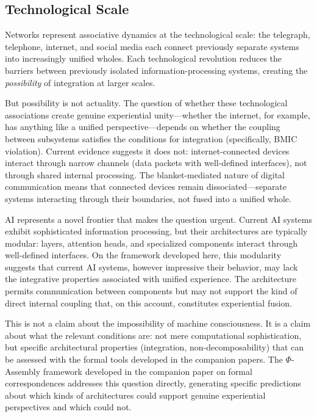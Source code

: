 \documentclass[11pt,a4paper]{article}
\theoremstyle{definition}
\theoremstyle{plain}
\theoremstyle{remark}
\begin{document}
\subsection{Technological Scale}\label{sec:technological}

Networks represent associative dynamics at the technological scale: the telegraph, telephone, internet, and social media each connect previously separate systems into increasingly unified wholes. Each technological revolution reduces the barriers between previously isolated information-processing systems, creating the \textit{possibility} of integration at larger scales.

But possibility is not actuality. The question of whether these technological associations create genuine experiential unity---whether the internet, for example, has anything like a unified perspective---depends on whether the coupling between subsystems satisfies the conditions for integration (specifically, BMIC violation). Current evidence suggests it does not: internet-connected devices interact through narrow channels (data packets with well-defined interfaces), not through shared internal processing. The blanket-mediated nature of digital communication means that connected devices remain dissociated---separate systems interacting through their boundaries, not fused into a unified whole.

AI represents a novel frontier that makes the question urgent. Current AI systems exhibit sophisticated information processing, but their architectures are typically modular: layers, attention heads, and specialized components interact through well-defined interfaces. On the framework developed here, this modularity suggests that current AI systems, however impressive their behavior, may lack the integrative properties associated with unified experience. The architecture permits communication between components but may not support the kind of direct internal coupling that, on this account, constitutes experiential fusion.

This is not a claim about the impossibility of machine consciousness. It is a claim about what the relevant conditions are: not mere computational sophistication, but specific architectural properties (integration, non-decomposability) that can be assessed with the formal tools developed in the companion papers. The $\Phi$-Assembly framework developed in the companion paper on formal correspondences addresses this question directly, generating specific predictions about which kinds of architectures could support genuine experiential perspectives and which could not.
\end{document}

